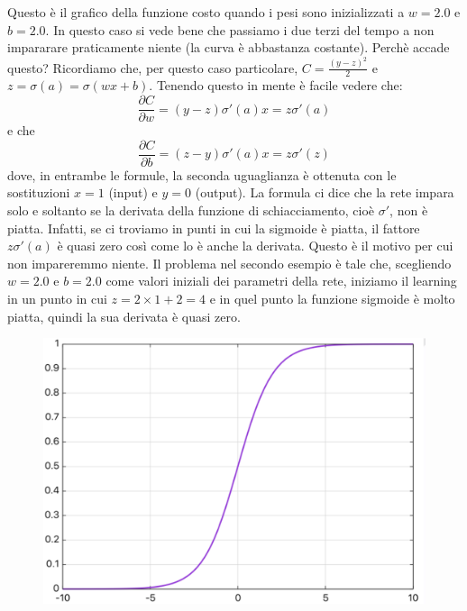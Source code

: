 Questo è il grafico della funzione costo quando i pesi sono inizializzati a $w=2.0$ e $b=2.0$. In questo caso si vede bene che passiamo i due terzi del tempo a non impararare praticamente niente (la curva è abbastanza costante).
\newline
\newline
Perchè accade questo? Ricordiamo che, per questo caso particolare, $C=\frac{(y-z)^2}{2}$ e $z=\sigma(a)=\sigma(wx+b)$. Tenendo questo in mente è facile vedere che:
\begin{equation}
    \frac{\partial C}{\partial w} = (y-z)\sigma'(a)x=z\sigma'(a)   
\end{equation}
e che
\begin{equation}
    \frac{\partial C}{\partial b} = (z-y)\sigma'(a)x=z\sigma'(z)   
\end{equation}
dove, in entrambe le formule, la seconda uguaglianza è ottenuta con le sostituzioni $x=1$ (input) e $y=0$ (output). La formula ci dice che la rete impara solo e soltanto se la derivata della funzione di schiacciamento, cioè $\sigma'$, non è piatta. Infatti, se ci troviamo in punti in cui la sigmoide è piatta, il fattore $z\sigma'(a)$ è quasi zero così come lo è anche la derivata. Questo è il motivo per cui non impareremmo niente.
\newpage
Il problema nel secondo esempio è tale che, scegliendo $w=2.0$ e $b=2.0$ come valori iniziali dei parametri della rete, iniziamo il learning in un punto in cui $z=2\times1+2=4$ e in quel punto la funzione sigmoide è molto piatta, quindi la sua derivata è quasi zero.
\begin{figure}[h]
    \includegraphics[scale=.4]{images/best_practices/slow_learn.png}
    \centering
\end{figure}

